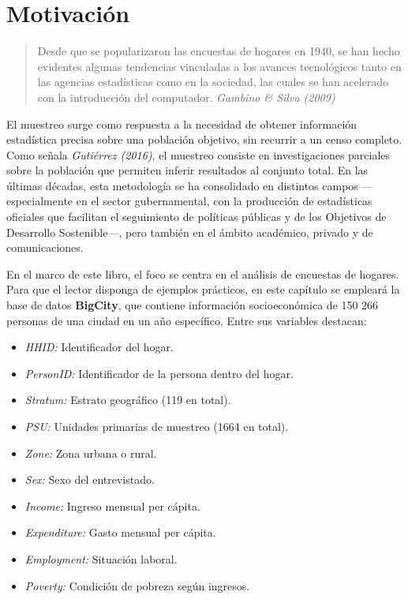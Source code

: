 \documentclass[
  spanish,
  12pt,
]{book}
\providecommand{\tightlist}{%
  \setlength{\itemsep}{0pt}\setlength{\parskip}{0pt}}
\begin{document}
\section{Motivación}\label{motivaciuxf3n}

\begin{quote}
Desde que se popularizaron las encuestas de hogares en 1940, se han hecho evidentes algunas tendencias vinculadas a los avances tecnológicos tanto en las agencias estadísticas como en la sociedad, las cuales se han acelerado con la introducción del computador.
\emph{Gambino \& Silva (2009)}
\end{quote}

El muestreo surge como respuesta a la necesidad de obtener información estadística precisa sobre una población objetivo, sin recurrir a un censo completo. Como señala \emph{Gutiérrez (2016)}, el muestreo consiste en investigaciones parciales sobre la población que permiten inferir resultados al conjunto total. En las últimas décadas, esta metodología se ha consolidado en distintos campos ---especialmente en el sector gubernamental, con la producción de estadísticas oficiales que facilitan el seguimiento de políticas públicas y de los Objetivos de Desarrollo Sostenible---, pero también en el ámbito académico, privado y de comunicaciones.

En el marco de este libro, el foco se centra en el análisis de encuestas de hogares. Para que el lector disponga de ejemplos prácticos, en este capítulo se empleará la base de datos \textbf{BigCity}, que contiene información socioeconómica de 150 266 personas de una ciudad en un año específico. Entre sus variables destacan:

\begin{itemize}
\tightlist
\item
  \emph{HHID:} Identificador del hogar.
\item
  \emph{PersonID:} Identificador de la persona dentro del hogar.
\item
  \emph{Stratum:} Estrato geográfico (119 en total).
\item
  \emph{PSU:} Unidades primarias de muestreo (1664 en total).
\item
  \emph{Zone:} Zona urbana o rural.
\item
  \emph{Sex:} Sexo del entrevistado.
\item
  \emph{Income:} Ingreso mensual per cápita.
\item
  \emph{Expenditure:} Gasto mensual per cápita.
\item
  \emph{Employment:} Situación laboral.
\item
  \emph{Poverty:} Condición de pobreza según ingresos.
\end{itemize}
\end{document}
